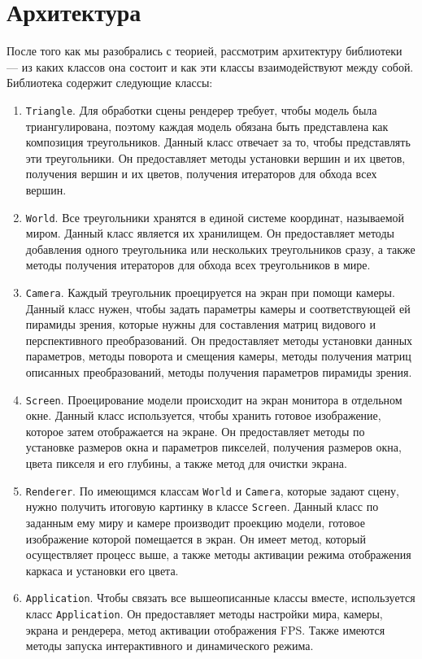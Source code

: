 \documentclass{article}
\begin{document}
\newpage

\section{Архитектура} \label{architecture section}

После того как мы разобрались с теорией, рассмотрим архитектуру библиотеки --- из каких классов она состоит и как эти классы взаимодействуют между собой.
Библиотека содержит следующие классы:

\begin{enumerate}
	\item \verb"Triangle".
	Для обработки сцены рендерер требует, чтобы модель была триангулирована, поэтому каждая модель обязана быть представлена как композиция треугольников.
	Данный класс отвечает за то, чтобы представлять эти треугольники.
	Он предоставляет методы установки вершин и их цветов, получения вершин и их цветов, получения итераторов для обхода всех вершин.
	\item \verb"World".
	Все треугольники хранятся в единой системе координат, называемой миром.
	Данный класс является их хранилищем.
	Он предоставляет методы добавления одного треугольника или нескольких треугольников сразу, а также методы получения итераторов для обхода всех треугольников в мире.
	\item \verb"Camera".
	Каждый треугольник проецируется на экран при помощи камеры.
	Данный класс нужен, чтобы задать параметры камеры и соответствующей ей пирамиды зрения, которые нужны для составления матриц видового и перспективного преобразований.
	Он предоставляет методы установки данных параметров, методы поворота и смещения камеры, методы получения матриц описанных преобразований, методы получения параметров пирамиды зрения.
	\item \verb"Screen".
	Проецирование модели происходит на экран монитора в отдельном окне.
	Данный класс используется, чтобы хранить готовое изображение, которое затем отображается на экране.
	Он предоставляет методы по установке размеров окна и параметров пикселей, получения размеров окна, цвета пикселя и его глубины, а также метод для очистки экрана.
	\item \verb"Renderer".
	По имеющимся классам \verb"World" и \verb"Camera", которые задают сцену, нужно получить итоговую картинку в классе \verb"Screen".
	Данный класс по заданным ему миру и камере производит проекцию модели, готовое изображение которой помещается в экран.
	Он имеет метод, который осуществляет процесс выше, а также методы активации режима отображения каркаса и установки его цвета.
	\item \verb"Application".
	Чтобы связать все вышеописанные классы вместе, используется класс \verb"Application".
	Он предоставляет методы настройки мира, камеры, экрана и рендерера, метод активации отображения FPS.
	Также имеются методы запуска интерактивного и динамического режима.
\end{enumerate}
\end{document}
